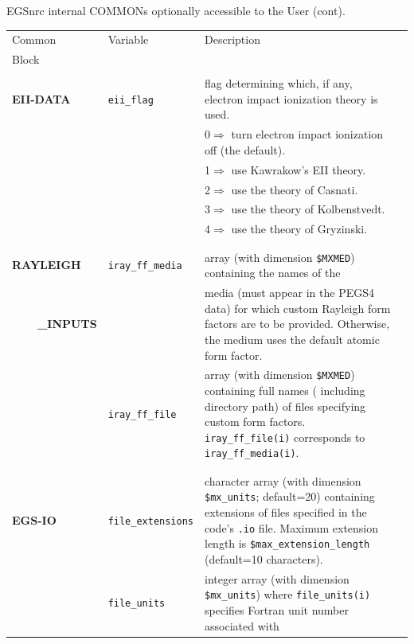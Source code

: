 \begin{table}[htb]

     
    \begin{center}
    EGSnrc internal COMMONs optionally accessible to the User (cont).
    \begin{tabular}{ l  l   p{105mm}l  |}
    \hline
    Common & Variable & Description \\
    Block &&\\
    \hline
&&\\
{\bfseries EII-DATA} & {\tt eii\_flag} & flag determining which, if any, electron
impact ionization theory is used.\\
&& 0$\Rightarrow$ turn electron impact ionization off (the default).\\
&& 1$\Rightarrow$ use Kawrakow's EII theory\cite{Ka02b}.\\
&& 2$\Rightarrow$ use the theory of Casnati\cite{Ca82}.\\
&& 3$\Rightarrow$ use the theory of Kolbenstvedt\cite{Gr65a}.\\
&& 4$\Rightarrow$ use the theory of Gryzinski\cite{Ko67}.\\
&&\\
\hline
&&\\
{\bfseries RAYLEIGH} & {\tt iray\_ff\_media} & array (with dimension
{\tt \$MXMED}) containing the names of the\\
{\bfseries \mbox{~~~~}\_INPUTS}&& media (must appear in the PEGS4 data) for which custom Rayleigh
form factors are to be provided.  Otherwise, the medium
uses the default atomic form factor.\\
& {\tt iray\_ff\_file} & array (with dimension {\tt \$MXMED}) containing
full names ({\em} including directory path) of files specifying
custom form factors.  {\tt iray\_ff\_file(i)} corresponds to
{\tt iray\_ff\_media(i)}.\\
&&\\
\hline
&&\\
{\bfseries EGS-IO} & {\tt file\_extensions} & character array (with
dimension {\tt \$mx\_units}; default=20) containing
extensions of files specified in the code's {\tt .io} file.
Maximum extension length is {\tt \$max\_extension\_length} (default=10 characters).\\
& {\tt file\_units} & integer array (with
dimension {\tt \$mx\_units}) where {\tt file\_units(i)} specifies Fortran unit number associated with

\end{tabular}
\end{center}
\end{table}
